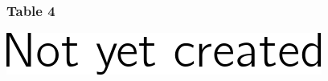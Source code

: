 \documentclass[]{article}
\begin{document}

\subsubsection{Table 4}\label{table-4}

\includegraphics{figures/alexander4-1.png}
\end{document}
